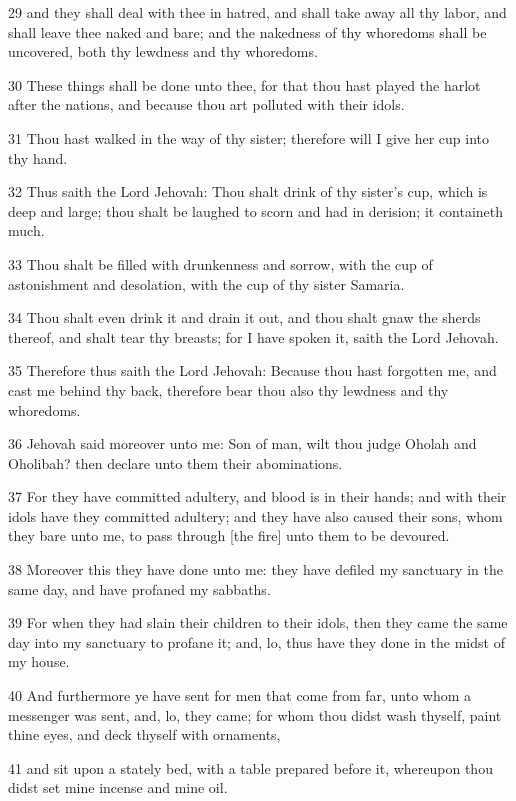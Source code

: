 \par 29 and they shall deal with thee in hatred, and shall take away all thy labor, and shall leave thee naked and bare; and the nakedness of thy whoredoms shall be uncovered, both thy lewdness and thy whoredoms.
\par 30 These things shall be done unto thee, for that thou hast played the harlot after the nations, and because thou art polluted with their idols.
\par 31 Thou hast walked in the way of thy sister; therefore will I give her cup into thy hand.
\par 32 Thus saith the Lord Jehovah: Thou shalt drink of thy sister's cup, which is deep and large; thou shalt be laughed to scorn and had in derision; it containeth much.
\par 33 Thou shalt be filled with drunkenness and sorrow, with the cup of astonishment and desolation, with the cup of thy sister Samaria.
\par 34 Thou shalt even drink it and drain it out, and thou shalt gnaw the sherds thereof, and shalt tear thy breasts; for I have spoken it, saith the Lord Jehovah.
\par 35 Therefore thus saith the Lord Jehovah: Because thou hast forgotten me, and cast me behind thy back, therefore bear thou also thy lewdness and thy whoredoms.
\par 36 Jehovah said moreover unto me: Son of man, wilt thou judge Oholah and Oholibah? then declare unto them their abominations.
\par 37 For they have committed adultery, and blood is in their hands; and with their idols have they committed adultery; and they have also caused their sons, whom they bare unto me, to pass through [the fire] unto them to be devoured.
\par 38 Moreover this they have done unto me: they have defiled my sanctuary in the same day, and have profaned my sabbaths.
\par 39 For when they had slain their children to their idols, then they came the same day into my sanctuary to profane it; and, lo, thus have they done in the midst of my house.
\par 40 And furthermore ye have sent for men that come from far, unto whom a messenger was sent, and, lo, they came; for whom thou didst wash thyself, paint thine eyes, and deck thyself with ornaments,
\par 41 and sit upon a stately bed, with a table prepared before it, whereupon thou didst set mine incense and mine oil.
